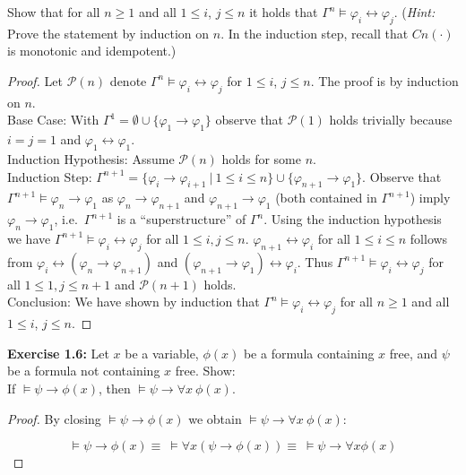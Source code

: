 \documentclass[11pt,a4paper]{article}
\theoremstyle{remark}
\newcommand{\entails}{\models}
\newcommand{\exercise}[1]{{\bfseries{Exercise #1:}}}
\begin{document}
Show that for all $n \geq 1$ and all $1 \leq i$, $j \leq n$ it holds that $\Gamma^n \entails \varphi_i \leftrightarrow \varphi_j$.
(\emph{Hint:} Prove the statement by induction on $n$. In the induction step, recall that $Cn(\cdot)$ is
monotonic and idempotent.)
 
\begin{proof}Let $\mathcal{P}(n)$ denote $\Gamma^n \entails \varphi_i \leftrightarrow \varphi_j$ for $1 \leq i$, $j \leq n$. The proof is by induction on $n$.\\

Base Case: With $\Gamma^1 = \emptyset \cup \{ \varphi_1 \to \varphi_1 \}$ observe that $\mathcal{P}(1)$ holds trivially because $i = j = 1$ and $\varphi_1 \leftrightarrow \varphi_1$.\\

Induction Hypothesis: Assume $\mathcal{P}(n)$ holds for some $n$.\\

Induction Step: $\Gamma^{n+1} = \{\varphi_i \to \varphi_{i+1} \ | \ 1 \leq i \leq n \} \cup \{ \varphi_{n+1} \to \varphi_1 \}$. Observe that $\Gamma^{n+1} \entails \varphi_n \to \varphi_1$ as $\varphi_n \to \varphi_{n+1}$ and $\varphi_{n+1} \to \varphi_1$ (both contained in $\Gamma^{n+1}$) imply $\varphi_n \to \varphi_1$, i.e.~$\Gamma^{n+1}$ is a \enquote{superstructure} of $\Gamma^n$.
Using the induction hypothesis we have $\Gamma^{n+1} \entails \varphi_i \leftrightarrow \varphi_j$ for all $1 \leq i, j \leq n$. $\varphi_{n+1} \leftrightarrow \varphi_i$ for all $1 \leq i \leq n$ follows from $\varphi_i \leftrightarrow (\varphi_n \to \varphi_{n+1})$ and $(\varphi_{n+1} \to \varphi_1) \leftrightarrow \varphi_i$. Thus $\Gamma^{n+1} \entails \varphi_i \leftrightarrow \varphi_j$ for all $1 \leq 1, j \leq n+1$ and $\mathcal{P}(n+1)$ holds.\\

Conclusion: We have shown by induction that $\Gamma^n \entails \varphi_i \leftrightarrow \varphi_j$ for all $n \geq 1$ and all $1 \leq i$, $j \leq n$.
\end{proof}

\exercise{1.6} Let $x$ be a variable, $\phi(x)$ be a formula containing $x$ free, and $\psi$ be a formula not containing $x$ free. Show:\\

If $\entails \psi \to \phi(x)$, then $\entails \psi \to \forall x \ \phi (x)$.

\begin{proof}
By closing $\entails \psi \to \phi(x)$ we obtain $\entails \psi \to \forall x \ \phi (x)$:

$$\entails \psi \to \phi(x) \equiv \ \entails \forall x (\psi \to \phi(x)) \equiv \ \entails \psi \to \forall x \phi(x)$$
\end{proof}
\end{document}
